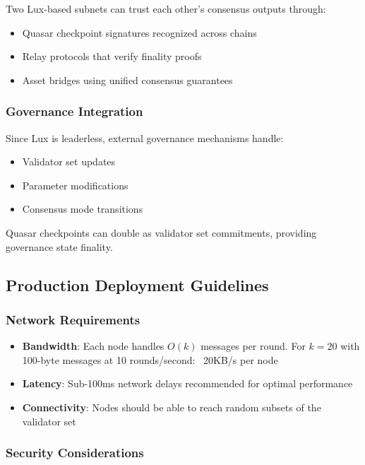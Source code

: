 Two Lux-based subnets can trust each other's consensus outputs through:
\begin{itemize}
\item Quasar checkpoint signatures recognized across chains
\item Relay protocols that verify finality proofs
\item Asset bridges using unified consensus guarantees
\end{itemize}

\subsubsection{Governance Integration}

Since Lux is leaderless, external governance mechanisms handle:
\begin{itemize}
\item Validator set updates
\item Parameter modifications  
\item Consensus mode transitions
\end{itemize}

Quasar checkpoints can double as validator set commitments, providing governance state finality.

\subsection{Production Deployment Guidelines}

\subsubsection{Network Requirements}

\begin{itemize}
\item \textbf{Bandwidth}: Each node handles $O(k)$ messages per round. For $k=20$ with 100-byte messages at 10 rounds/second: ~20KB/s per node
\item \textbf{Latency}: Sub-100ms network delays recommended for optimal performance
\item \textbf{Connectivity}: Nodes should be able to reach random subsets of the validator set
\end{itemize}

\subsubsection{Security Considerations}

